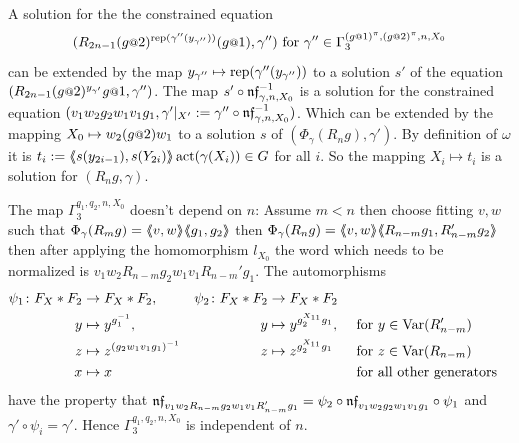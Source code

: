 \documentclass[a4paper,11pt]{amsart}
\begin{document}
 A solution for the the constrained equation
 \[(R_{2n-1}(g\at2)^{\textup{rep}(\gamma''({y_{\gamma''}}))}(g\at1),\gamma'')\textup{ for }\gamma'' \in \Gamma_3^{(g\at{1})^\pi,(g\at{2})^\pi,n,X_0}\]
 can be 
 extended by the map ${y_{\gamma''}}\mapsto \textup{rep}(\gamma''({y_{\gamma''}}))$ to a solution $s'$ 
 of the equation $(R_{2n-1} (g\at{2})^{{y_{\gamma'}}} g\at{1},\gamma'')$. The map $s'\circ \mathfrak{nf}_{\gamma,n,X_0}^{-1}$ 
 is a solution for the constrained equation $(v_1w_2g_2w_1v_1g_1,\gamma'|_{X'}:=\gamma'' \circ \mathfrak{nf}_{\gamma,n,X_0}^{-1})$.
 Which can be extended by the mapping $X_0\mapsto w_2(g\at{2})w_1$ to a solution $s$ of $(\Phi_\gamma(R_n g),\gamma')$.
 By definition of $\omega$ it is $t_i:=\langle\negthickspace\langle s(y_{2i-1}),s(Y_{2i})\rangle\negthickspace\rangle\operatorname{act}(\gamma(X_i)) \in G$ for all $i$. So the mapping $X_i\mapsto t_i$ is a solution for $(R_ng,\gamma)$.
 
 The map $\Gamma_3^{q_1,q_2,n,X_0}$ doesn't depend on %
 $n$: Assume $m<n$ then choose  
 fitting $v,w$ such that $\Phi_\gamma(R_mg)=\langle\negthickspace\langle v,w\rangle\negthickspace\rangle\langle\negthickspace\langle g_1,g_2\rangle\negthickspace\rangle$ then $\Phi_\gamma(R_ng)=\langle\negthickspace\langle v,w\rangle\negthickspace\rangle\langle\negthickspace\langle R_{n-m}g_1,R_{n-m}'g_2\rangle\negthickspace\rangle$ 
 then after applying the homomorphism $l_{X_0}$ 
 the word which needs to be normalized is $v_1w_2R_{n-m}g_2w_1v_1R_{n-m}'g_1$. The automorphisms
 \begin{align*}
 \psi_1 \colon F_X*F_2 &\to F_X*F_2, & \psi_2 \colon F_X*F_2 &\to F_X*F_2\\
 y &\mapsto y^{g_1^{-1}}, & y &\mapsto y^{g_2^{X_{11}}g_1}, & &\text{ for }y\in \textup{Var}(R_{n-m}')\\
 z &\mapsto z^{(g_2w_1v_1g_1)^{-1}}& z &\mapsto z^{g_2^{X_{11}}g_1}  & &\text{ for }z\in \textup{Var}(R_{n-m})\\
 x &\mapsto x & & & &\text{ for all other generators}
 \end{align*}
 have the property that $\mathfrak{nf}_{v_1w_2R_{n-m}g_2w_1v_1R_{n-m}'g_1} = \psi_2\circ\mathfrak{nf}_{v_1w_2g_2w_1v_1g_1}\circ \psi_1$ and 
 $\gamma' \circ \psi_i = \gamma'$. Hence $\Gamma_3^{q_1,q_2,n,X_0}$ is independent of $n$.
 
\end{document}
